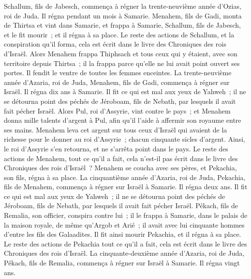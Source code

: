 \begin{multicols}{2}
Schallum, fils de Jabesch, commença à régner la trente-neuvième année d'Ozias, roi de Juda. Il régna pendant un mois à Samarie.
Menahem, fils de Gadi, monta de Thirtsa et vint dans Samarie, et frappa à Samarie, Schallum, fils de Jabesch, et le fit mourir~; et il régna à sa place.
Le reste des actions de Schallum, et la conspiration qu'il forma, cela est écrit dans le livre des Chroniques des rois d'Israël.
Alors Menahem frappa Thiphsach et tous ceux qui y étaient, avec son territoire depuis Thirtsa~; il la frappa parce qu'elle ne lui avait point ouvert ses portes. Il fendit le ventre de toutes les femmes enceintes.
La trente-neuvième année d'Azaria, roi de Juda, Menahem, fils de Gadi, commença à régner sur Israël. Il régna dix ans à Samarie.
Il fit ce qui est mal aux yeux de Yahweh~; il ne se détourna point des péchés de Jéroboam, fils de Nebath, par lesquels il avait fait pécher Israël.
Alors Pul, roi d'Assyrie, vint contre le pays~; et Menahem donna mille talents d'argent à Pul, afin qu'il l'aide à affermir son royaume entre ses mains.
Menahem leva cet argent sur tous ceux d'Israël qui avaient de la richesse pour le donner au roi d'Assyrie~; chacun cinquante sicles d'argent. Ainsi, le roi d'Assyrie s'en retourna, et ne s'arrêta point dans le pays.
Le reste des actions de Menahem, tout ce qu'il a fait, cela n'est-il pas écrit dans le livre des Chroniques des rois d'Israël~?
Menahem se coucha avec ses pères, et Pekachia, son fils, régna à sa place.
La cinquantième année d'Azaria, roi de Juda, Pekachia, fils de Menahem, commença à régner sur Israël à Samarie. Il régna deux ans.
Il fit ce qui est mal aux yeux de Yahweh~; il ne se détourna point des péchés de Jéroboam, fils de Nebath, par lesquels il avait fait pécher Israël.
Pékach, fils de Remalia, son officier, conspira contre lui~; il le frappa à Samarie, dans le palais de la maison royale, de même qu'Argob et Arié~; il avait avec lui cinquante hommes d'entre les fils des Galaadites. Il fit ainsi mourir Pekachia, et il régna à sa place.
Le reste des actions de Pekachia tout ce qu'il a fait, cela est écrit dans le livre des Chroniques des rois d'Israël.
La cinquante-deuxième année d'Azaria, roi de Juda, Pékach, fils de Remalia, commença à régner sur Israël à Samarie. Il régna vingt ans.

\end{multicols}
